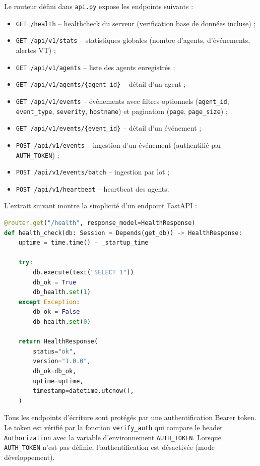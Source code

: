 Le routeur défini dans \texttt{api.py} expose les endpoints suivants :

\begin{itemize}
  \item \texttt{GET /health} -- healthcheck du serveur (verification base
    de données incluse) ;
  \item \texttt{GET /api/v1/stats} -- statistiques globales (nombre
    d'agents, d'événements, alertes VT) ;
  \item \texttt{GET /api/v1/agents} -- liste des agents enregistrés ;
  \item \texttt{GET /api/v1/agents/\{agent\_id\}} -- détail d'un agent ;
  \item \texttt{GET /api/v1/events} -- événements avec filtres optionnels
    (\texttt{agent\_id}, \texttt{event\_type}, \texttt{severity},
    \texttt{hostname}) et pagination (\texttt{page}, \texttt{page\_size}) ;
  \item \texttt{GET /api/v1/events/\{event\_id\}} -- détail d'un événement ;
  \item \texttt{POST /api/v1/events} -- ingestion d'un événement
    (authentifié par \texttt{AUTH\_TOKEN}) ;
  \item \texttt{POST /api/v1/events/batch} -- ingestion par lot ;
  \item \texttt{POST /api/v1/heartbeat} -- heartbeat des agents.
\end{itemize}

L'extrait suivant montre la simplicité d'un endpoint FastAPI :

\begin{lstlisting}[language=Python, caption={Endpoint de healthcheck}, label={lst:health-endpoint}]
@router.get("/health", response_model=HealthResponse)
def health_check(db: Session = Depends(get_db)) -> HealthResponse:
    uptime = time.time() - _startup_time

    try:
        db.execute(text("SELECT 1"))
        db_ok = True
        db_health.set(1)
    except Exception:
        db_ok = False
        db_health.set(0)

    return HealthResponse(
        status="ok",
        version="1.0.0",
        db_ok=db_ok,
        uptime=uptime,
        timestamp=datetime.utcnow(),
    )
\end{lstlisting}

Tous les endpoints d'écriture sont protégés par une authentification
Bearer token. Le token est vérifié par la fonction \texttt{verify\_auth}
qui compare le header \texttt{Authorization} avec la variable
d'environnement \texttt{AUTH\_TOKEN}. Lorsque \texttt{AUTH\_TOKEN} n'est
pas définie, l'authentification est désactivée (mode développement).

